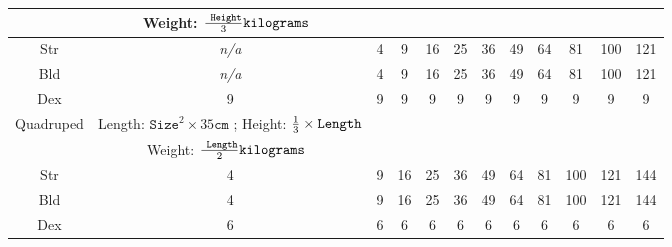 \documentclass[twoside]{book}
\begin{document}
\begin{table}[htb]
\begin{center}
\begin{tabular}{|c|c|c|c|c|c|c|c|c|c|c|c|}
\hline

& Weight: \begin{math}    {{\texttt{
                     Height}}\over{ 3 }}  \texttt{kilograms
                    }    \end{math}
                  \\

\hline

 Str &
                    \textit{n/a}
                  & 4 & 9 & 16 & 25 & 36 & 49 & 64 & 81 & 100 & 121 \\

\hline

 Bld &
                    \textit{n/a}
                  & 4 & 9 & 16 & 25 & 36 & 49 & 64 & 81 & 100 & 121 \\

\hline

 Dex & 9 & 9 & 9 & 9 & 9 & 9 & 9 & 9 & 9 & 9 & 9 \\

\hline

 Quadruped &  Length: \begin{math}  
                        {\texttt{Size}}^{ 2 }   \times     35 \texttt{
                           cm}  \end{math} ; Height: \begin{math} 
                           {{ 1 }\over{ 3 }}  
                           \times    \texttt{Length}  \end{math}
                  \\

\hline

&  Weight: \begin{math}    {{\texttt{
                     Length}}\over{ 2 }}  \texttt{kilograms
                    }    \end{math}
                  \\

\hline

 Str & 4 & 9 & 16 & 25 & 36 & 49 & 64 & 81 & 100 & 121 & 144 \\

\hline

 Bld & 4 & 9 & 16 & 25 & 36 & 49 & 64 & 81 & 100 & 121 & 144 \\

\hline

 Dex & 6 & 6 & 6 & 6 & 6 & 6 & 6 & 6 & 6 & 6 & 6 \\

\hline


\end{tabular}
\end{center}
\end{table}
\end{document}
